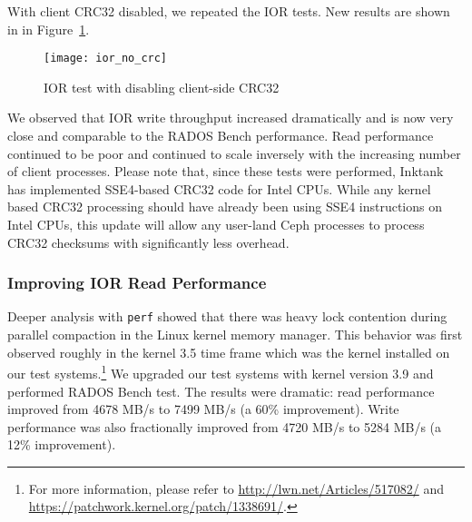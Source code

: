 With client CRC32 disabled, we repeated the IOR tests. New results are shown in
in Figure~\ref{fig:ior-no-client-crc32}. 

\begin{figure}[htb]
\centering
\texttt{[image: ior\_no\_crc]}
\caption{IOR test with disabling client-side CRC32}
\label{fig:ior-no-client-crc32}
\end{figure}

We observed that IOR write throughput increased dramatically and is now very
close and comparable to the RADOS Bench performance. Read performance continued
to be poor and continued to scale inversely with the increasing number of
client processes.  Please note that, since these tests were performed, Inktank
has implemented SSE4-based CRC32 code for Intel CPUs.  While any kernel based
CRC32 processing should have already been using SSE4 instructions on Intel
CPUs, this update will allow any user-land Ceph processes to process CRC32
checksums with significantly less overhead.

\subsubsection{Improving IOR Read Performance}

Deeper analysis with \verb!perf! showed that there was heavy lock contention
during parallel compaction in the Linux kernel memory manager.  This behavior
was first observed roughly in the kernel 3.5 time frame which was the kernel
installed on our test systems.\footnote{For more information,
please refer to \url{http://lwn.net/Articles/517082/} and
\url{https://patchwork.kernel.org/patch/1338691/}.}  We upgraded our test
systems with kernel version 3.9 and performed RADOS Bench test.  The results
were dramatic:  read performance improved from 4678 MB/s to 7499 MB/s 
(a 60\% improvement).  Write performance was also fractionally improved from
4720 MB/s to 5284 MB/s (a 12\% improvement).





